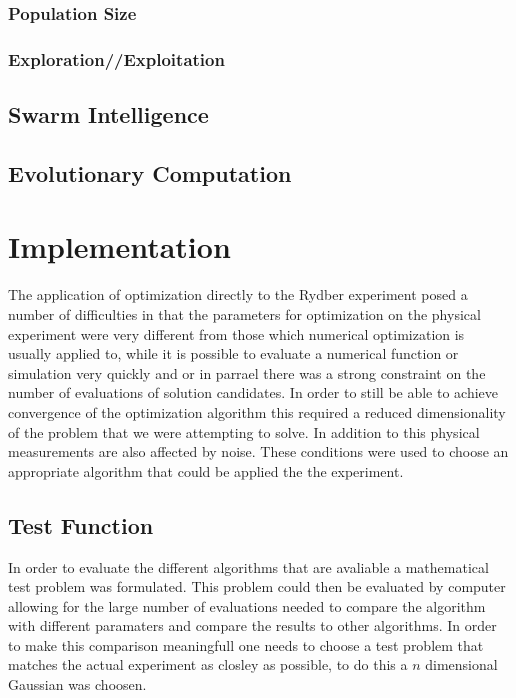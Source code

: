 \documentclass[a4paper,titlepage]{report}
\begin{document}
\subsection{Population Size}
\subsection{Exploration//Exploitation}


\section{Swarm Intelligence}

\section{Evolutionary Computation}

\chapter{Implementation}

The application of optimization directly to the Rydber experiment posed a number of difficulties in that the parameters for optimization on the physical experiment were very different from those which numerical optimization is usually applied to, while it is possible to evaluate a numerical function or simulation very quickly and or in parrael there was a strong constraint on the number of evaluations of solution candidates. In order to still be able to achieve convergence of the optimization algorithm this required a reduced dimensionality of the problem that we were attempting to solve. In addition to this physical measurements are also affected by noise. These conditions were used to choose an appropriate algorithm that could be applied the the experiment.

\section{Test Function}
In order to evaluate the different algorithms that are avaliable a mathematical test problem was formulated. This problem could then be evaluated by computer allowing for the large number of evaluations needed to compare the algorithm with different paramaters and compare the results to other algorithms. In order to make this comparison meaningfull one needs to choose a test problem that matches the actual experiment as closley as possible, to do this a $n$ dimensional Gaussian was choosen.
\end{document}
